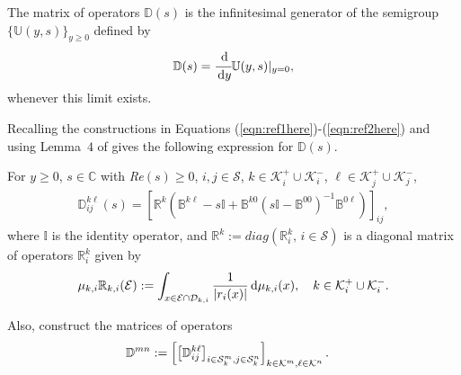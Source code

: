 The matrix of operators \(\mathbb D(s)\) is the infinitesimal generator of the semigroup \(\{\mathbb U(y,s)\}_{y\geq 0}\) defined by 
\[\mathbb D(s) = \cfrac{\, \mathrm{d}}{\, \mathrm{d} y}\mathbb U(y,s)|_{y=0},\]
whenever this limit exists.
			
	Recalling the constructions in Equations (\ref{eqn:ref1here})-(\ref{eqn:ref2here}) and using Lemma~$4$ of \cite{bo2014} gives the following expression for $\mathbb{D}(s)$. 
\begin{lem}\label{lemma: D(s)}
	For $y \geq 0$, $s \in \mathbb{C}$ with \textit{Re}$(s) \geq 0$, $i,j \in \mathcal{S}$, $k\in \mathcal K_i^+\cup\mathcal K_i^-$, $\ell\in \mathcal K_j^+\cup\mathcal K_j^-$,
	\begin{align*}
		\mathbb{D}_{ij}^{k\ell}(s) = [\mathbb{R}^{k}(
		\mathbb{B}^{k\ell } - s\mathbb{I} + \mathbb{B}^{k0 }(s \mathbb{I} - \mathbb{B}^{00})^{-1}\mathbb{B}^{0\ell})]_{ij}, 
	\end{align*} 
	where $\mathbb I$ is the identity operator, and $\mathbb{R}^{k} := diag(\mathbb{R}_i^{k},\,i \in \mathcal{S})$ is a diagonal matrix of operators $\mathbb{R}_i^{k}$ given by 
	\begin{align*} 
		{\mu}_{k,i}\mathbb{R}_{k,i}(\mathcal{E}) := \int_{x \in \mathcal{E} \cap \mathcal{D}_{k,i}} \frac{1}{|r_i(x)|}\, \mathrm{d}  \mu_{k,i}(x),\quad k\in \mathcal K_i^+\cup\mathcal K_i^-.
	\end{align*} 
\end{lem}

	Also, construct the matrices of operators 
	\begin{align*}
		\mathbb D^{m n} &:= \left[\left[\mathbb D_{ij}^{k \ell}\right]_{i\in\mathcal{S}_k^m,j\in\mathcal{S}_k^n}\right]_{k\in\mathcal K^m,\ell\in\mathcal K^n}.
        \end{align*}

